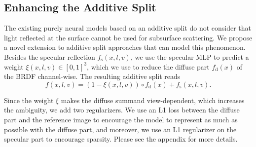 \subsection{Enhancing the Additive Split}
\label{sec:enhancingAddSplit}
The existing purely neural models based on an additive split do not consider that light reflected at the surface cannot be used for subsurface scattering.
We propose a novel extension to additive split approaches that can model this phenomenon. Besides the specular reflection $f_\text{s}(x, l, v)$, we use the specular MLP to predict a weight $\xi(x, l, v)\in [0, 1]^3$, which we use to reduce the diffuse part $f_\text{d}(x)$ of the BRDF channel-wise. The resulting additive split reads
\begin{equation}
    f(x, l, v) = (1 - \xi(x, l, v)) \circ f_\text{d}(x) + f_\text{s}(x, l, v).
\end{equation}

Since the weight $\xi$ makes the diffuse summand view-dependent, which increases the ambiguity, 
we add two regularizers. We use an L1 loss between the diffuse part and the reference image to encourage the model to represent as much as possible with the diffuse part, and moreover, we use an L1 regularizer on the specular part to encourage sparsity. Please see the appendix for more details.